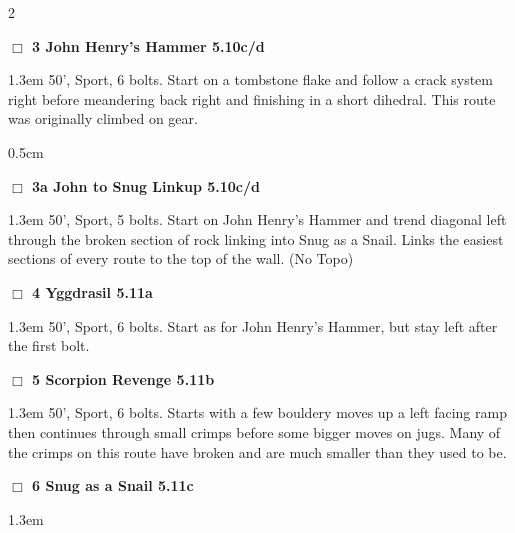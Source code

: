 	\begin{multicols}{2}
\needspace{2em}
\label{rt:John Henry's Hammer}
\colorbox{RoyalBlue!20}{
\parbox{0.95\linewidth}{
\hspace{-1ex}\textbf{$\Box$
3 John Henry's Hammer 5.10c/d  
}}}
\begin{adjustwidth}{1.3em}{}			
50', Sport, 6 bolts. Start on a tombstone flake and follow a crack system right before meandering back right and finishing in a short dihedral. This route was originally climbed on gear.
\end{adjustwidth}
\begin{adjustwidth}{0.5cm}{}				
\needspace{4em}
\needspace{2em}
\label{vr:John to Snug Linkup}
\colorbox{RoyalBlue!20}{
\parbox{0.95\linewidth}{
\hspace{-1ex}\textbf{$\Box$
3a John to Snug Linkup 5.10c/d  
}}}
\begin{adjustwidth}{1.3em}{}			
50', Sport, 5 bolts. Start on John Henry's Hammer and trend diagonal left through the broken section of rock linking into Snug as a Snail. Links the easiest sections of every route to the top of the wall.
  (No Topo)
\end{adjustwidth}
\end{adjustwidth}
\needspace{2em}
\label{rt:Yggdrasil}
\colorbox{RoyalBlue!20}{
\parbox{0.95\linewidth}{
\hspace{-1ex}\textbf{$\Box$
4 Yggdrasil 5.11a  
}}}
\begin{adjustwidth}{1.3em}{}			
50', Sport, 6 bolts. Start as for John Henry's Hammer, but stay left after the first bolt.
\end{adjustwidth}
\needspace{2em}
\label{rt:Scorpion Revenge}
\colorbox{RoyalBlue!20}{
\parbox{0.95\linewidth}{
\hspace{-1ex}\textbf{$\Box$
5 Scorpion Revenge 5.11b  
}}}
\begin{adjustwidth}{1.3em}{}			
50', Sport, 6 bolts. Starts with a few bouldery moves up a left facing ramp then continues through small crimps before some bigger moves on jugs. Many of the crimps on this route have broken and are much smaller than they used to be.
\end{adjustwidth}
\needspace{2em}
\label{rt:Snug as a Snail}
\colorbox{RoyalBlue!20}{
\parbox{0.95\linewidth}{
\hspace{-1ex}\textbf{$\Box$
6 Snug as a Snail 5.11c  
}}}
\begin{adjustwidth}{1.3em}{}			

\end{adjustwidth}
\end{multicols}

